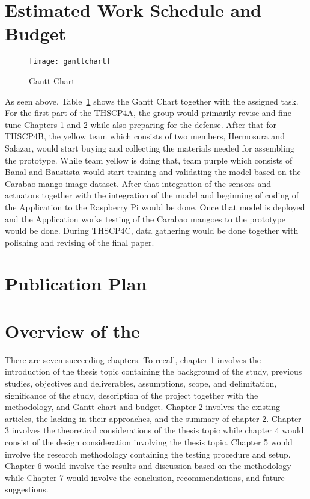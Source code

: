 \ifFinished
\else

\section{Estimated Work Schedule and Budget}

\begin{figure}[!htbp]
	\centering
	\texttt{[image: ganttchart]}
	\caption{Gantt Chart}
	\label{fig:img2}
\end{figure}

As seen above, Table~\ref{fig:img2} shows the Gantt Chart together with the assigned task. For the
first part of the THSCP4A, the group would primarily revise and fine tune Chapters 1
and 2 while also preparing for the defense. After that for THSCP4B, the yellow team
which consists of two members, Hermosura and Salazar, would start buying and
collecting the materials needed for assembling the prototype. While team yellow is
doing that, team purple which consists of Banal and Baustista would start training and
validating the  model based on the Carabao mango image dataset. After that
integration of the sensors and actuators together with the integration of the  model
and beginning of coding of the Application to the Raspberry Pi would be done. Once
that  model is deployed and the Application works testing of the Carabao mangoes
to the prototype would be done. During THSCP4C, data gathering would be done
together with polishing and revising of the final paper.

\ifPhD
\section{Publication Plan}
\graytx{\blindtext}
\fi

\fi


\section{Overview of the \documentType}

There are seven succeeding chapters. To recall, chapter 1 involves the introduction of the
thesis topic containing the background of the study, previous studies, objectives and
deliverables, assumptions, scope, and delimitation, significance of the study, description
of the project together with the methodology, and Gantt chart and budget. Chapter 2
involves the existing articles, the lacking in their approaches, and the summary of
chapter 2. Chapter 3 involves the theoretical considerations of the thesis topic while
chapter 4 would consist of the design consideration involving the thesis topic. Chapter 5
would involve the research methodology containing the testing procedure and setup.
Chapter 6 would involve the results and discussion based on the methodology while
Chapter 7 would involve the conclusion, recommendations, and future suggestions.
